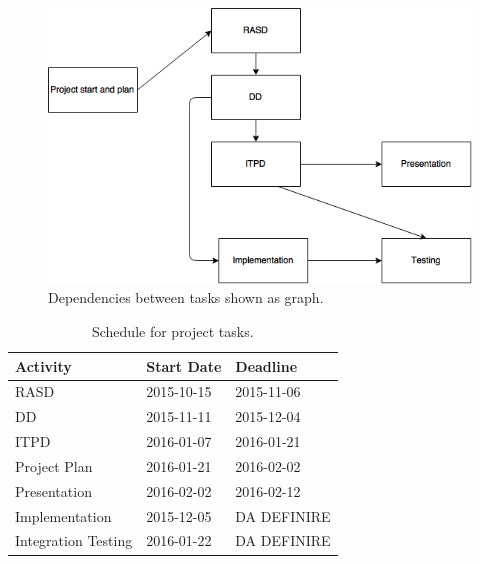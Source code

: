 \begin{figure}
    \centering
    \includegraphics[width=\textwidth]{img/tasks-dep-graph.jpg}
    \caption{Dependencies between tasks shown as graph.}
    \label{fig:tasks-dep-graph}
\end{figure}

\begin{table}[p]
    \centering
    \begin{tabular}{| l | l | l |}
        \hline
        \textbf{Activity}   & \textbf{Start Date}   & \textbf{Deadline} \\
        \hline
        RASD                & 2015-10-15            & 2015-11-06        \\
        DD                  & 2015-11-11            & 2015-12-04        \\
        ITPD                & 2016-01-07            & 2016-01-21        \\
        Project Plan        & 2016-01-21            & 2016-02-02        \\
        Presentation        & 2016-02-02            & 2016-02-12        \\
        Implementation      & 2015-12-05            & DA DEFINIRE       \\
        Integration Testing & 2016-01-22            & DA DEFINIRE       \\
        \hline
    \end{tabular}
    \caption{Schedule for project tasks.}
    \label{tab:schedule}
\end{table}

